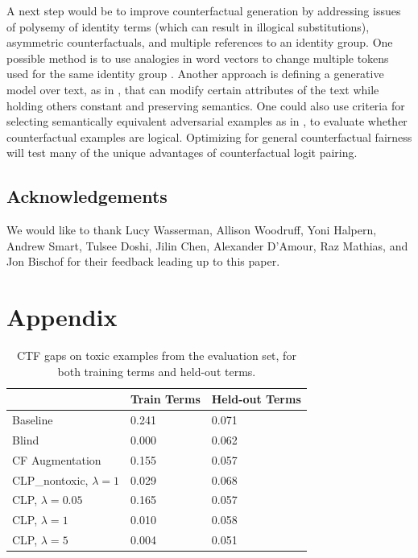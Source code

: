 \documentclass[letterpaper]{article} %
\theoremstyle{definition}
\begin{document}
A next step would be to improve counterfactual generation by addressing issues of polysemy of identity terms (which can result in illogical substitutions), asymmetric counterfactuals, and multiple references to an identity group. One possible method is to use analogies in word vectors to change multiple tokens used for the same identity group \cite{Madaan18}. Another approach is defining a generative model over text, as in \cite{Hu17}, that can modify certain attributes of the text while holding others constant and preserving semantics. 
One could also use criteria for selecting semantically equivalent adversarial examples as in \cite{SEAR}, to evaluate whether counterfactual examples are logical. Optimizing for general counterfactual fairness will test many of the unique advantages of counterfactual logit pairing. 

\subsection{Acknowledgements}
We would like to thank Lucy Wasserman, Allison Woodruff, Yoni
Halpern, Andrew Smart, Tulsee Doshi, Jilin Chen, Alexander D’Amour,
Raz Mathias, and Jon Bischof for their feedback leading up to this
paper.





\clearpage
\onecolumn
\appendix
\section{Appendix}

\begin{table}[h]
\centering
\begin{tabular}{l|l|l|}
\cline{2-3}
                                                 & Train Terms & Held-out Terms \\ \hline
\multicolumn{1}{|l|}{Baseline}                   & 0.241       & 0.071          \\ \hline
\multicolumn{1}{|l|}{Blind}                      & 0.000       & 0.062          \\ \hline
\multicolumn{1}{|l|}{CF Augmentation}            & 0.155       & 0.057          \\ \hline
\multicolumn{1}{|l|}{CLP\_nontoxic, $\lambda=1$} & 0.029       & 0.068          \\ \hline
\multicolumn{1}{|l|}{CLP,  $\lambda=0.05$}       & 0.165       & 0.057          \\ \hline
\multicolumn{1}{|l|}{CLP,  $\lambda=1$}          & 0.010       & 0.058          \\ \hline
\multicolumn{1}{|l|}{CLP,  $\lambda=5$}          & 0.004       & 0.051          \\ \hline
\end{tabular}
\caption{CTF gaps on toxic examples from the evaluation set, for both training terms and held-out terms.}\label{tab:ctf_toxic}

\end{table}
\end{document}
